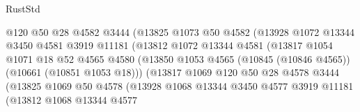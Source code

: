 \begin{lexlean}{RustStd}
\begin{coremodule}
                                  @120
                                  @50
                                  @28
                                  @4582
                                  @3444
                                  (@13825
                                    @1073
                                    @50
                                    @4582
                                    (@13928
                                      @1072
                                      @13344
                                      @3450
                                      @4581
                                      @3919
                                      @11181
                                      (@13812
                                        @1072
                                        @13344
                                        @4581
                                        (@13817
                                          @1054
                                          @1071
                                          @18
                                          @52
                                          @4565
                                          @4580
                                          (@13850
                                            @1053
                                            @4565
                                            (@10845 (@10846 @4565))
                                            (@10661 (@10851 @1053 @18)))
                                          (@13817
                                            @1069
                                            @120
                                            @50
                                            @28
                                            @4578
                                            @3444
                                            (@13825
                                              @1069
                                              @50
                                              @4578
                                              (@13928
                                                @1068
                                                @13344
                                                @3450
                                                @4577
                                                @3919
                                                @11181
                                                (@13812
                                                  @1068
                                                  @13344
                                                  @4577

\end{coremodule}
\end{lexlean}
